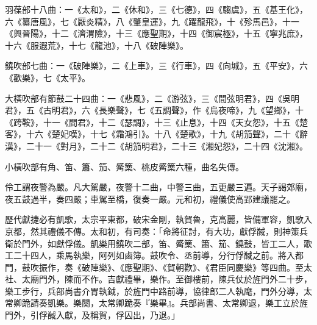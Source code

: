 \begin{pinyinscope}
 羽葆部十八曲：一《太和》，二《休和》，三《七德》，四《騶虞》，五《基王化》，六《纂唐風》，七《厭炎精》，八《肇皇運》，九《躍龍飛》，十《殄馬邑》，十一《興晉陽》，十二《濟渭險》，十三《應聖期》，十四《御宸極》，十五《寧兆庶》，十六《服遐荒》，十七《龍池》，十八《破陣樂》。



 鐃吹部七曲：一《破陣樂》，二《上車》，三《行車》，四《向城》，五《平安》，六《歡樂》，七《太平》。



 大橫吹部有節鼓二十四曲：一《悲風》，二《游弦》，三《間弦明君》，四《吳明君》，五《古明君》，六《長樂聲》，七《五調聲》，作《烏夜啼》，九《望鄉》，十《跨鞍》，十一《間君》，十二《瑟調》，十三《止息》，十四《天女怨》，十五《楚客》，十六《楚妃嘆》，十七《霜鴻引》。十八《楚歌》，十九《胡笳聲》，二十《辭漢》，二十一《對月》，二十二《胡笳明君》，二十三《湘妃怨》，二十四《沈湘》。



 小橫吹部有角、笛、簫、笳、觱篥、桃皮觱篥六種，曲名失傳。



 伶工謂夜警為嚴。凡大駕嚴，夜警十二曲，中警三曲，五更嚴三遍。天子謁郊廟，夜五鼓過半，奏四嚴；車駕至橋，復奏一嚴。元和初，禮儀使高郢建議罷之。



 歷代獻捷必有凱歌，太宗平東都，破宋金剛，執賀魯，克高麗，皆備軍容，凱歌入京都，然其禮儀不傳。太和初，有司奏：「命將征討，有大功，獻俘馘，則神策兵衛於門外，如獻俘儀。凱樂用鐃吹二部，笛、觱篥、簫、笳、鐃鼓，皆工二人，歌工二十四人，乘馬執樂，阿列如鹵簿。鼓吹令、丞前導，分行俘馘之前。將入都門，鼓吹振作，奏《破陣樂》、《應聖期》、《賀朝歡》、《君臣同慶樂》等四曲。至太社、太廟門外，陳而不作。吉獻禮畢，樂作。至御樓前，陳兵仗於旌門外二十步，樂工步行，兵部尚書介胃執鉞，於旌門中路前導，協律郎二人執麾，門外分導，太常卿跪請奏凱樂。樂闋，太常卿跪奏『樂畢』。兵部尚書、太常卿退，樂工立於旌門外，引俘馘入獻，及稱賀，俘囚出，乃退。」



\end{pinyinscope}